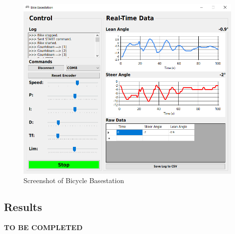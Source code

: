 \begin{figure}[H]
\centering
\includegraphics[scale=0.7]{Basestation}
\caption{Screenshot of Bicycle Basestation}
\label{fig:basestation}
\end{figure}

\subsection{Results}
\textbf{TO BE COMPLETED}

\newpage